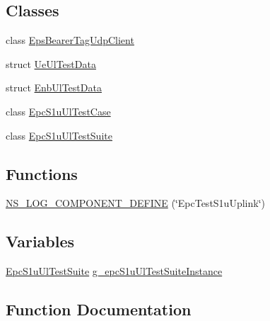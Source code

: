 \subsection*{Classes}
\begin{DoxyCompactItemize}
\item 
class \hyperlink{classEpsBearerTagUdpClient}{Eps\+Bearer\+Tag\+Udp\+Client}
\item 
struct \hyperlink{structUeUlTestData}{Ue\+Ul\+Test\+Data}
\item 
struct \hyperlink{structEnbUlTestData}{Enb\+Ul\+Test\+Data}
\item 
class \hyperlink{classEpcS1uUlTestCase}{Epc\+S1u\+Ul\+Test\+Case}
\item 
class \hyperlink{classEpcS1uUlTestSuite}{Epc\+S1u\+Ul\+Test\+Suite}
\end{DoxyCompactItemize}
\subsection*{Functions}
\begin{DoxyCompactItemize}
\item 
\hyperlink{epc-test-s1u-uplink_8cc_ae8ab9d34035ba65286f5bc3002e1532c}{N\+S\+\_\+\+L\+O\+G\+\_\+\+C\+O\+M\+P\+O\+N\+E\+N\+T\+\_\+\+D\+E\+F\+I\+NE} (\char`\"{}Epc\+Test\+S1u\+Uplink\char`\"{})
\end{DoxyCompactItemize}
\subsection*{Variables}
\begin{DoxyCompactItemize}
\item 
\hyperlink{classEpcS1uUlTestSuite}{Epc\+S1u\+Ul\+Test\+Suite} \hyperlink{epc-test-s1u-uplink_8cc_ae5681ef76b449ec9c0a73fe7b1adef9a}{g\+\_\+epc\+S1u\+Ul\+Test\+Suite\+Instance}
\end{DoxyCompactItemize}


\subsection{Function Documentation}

